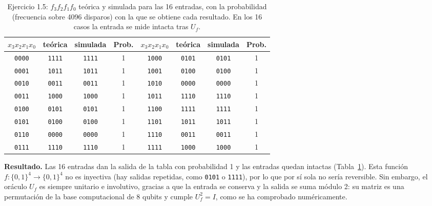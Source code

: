 \begin{table}[htbp]
    \centering
{\small\setlength{\tabcolsep}{4pt}
\begin{tabular}{c|c|c|c||c|c|c|c}
\hline
$x_3x_2x_1x_0$ & teórica & simulada & Prob. & $x_3x_2x_1x_0$ & teórica & simulada & Prob. \\
\hline
\texttt{0000} & \texttt{1111} & \texttt{1111} & 1 & \texttt{1000} & \texttt{0101} & \texttt{0101} & 1 \\
\texttt{0001} & \texttt{1011} & \texttt{1011} & 1 & \texttt{1001} & \texttt{0100} & \texttt{0100} & 1 \\
\texttt{0010} & \texttt{0011} & \texttt{0011} & 1 & \texttt{1010} & \texttt{0000} & \texttt{0000} & 1 \\
\texttt{0011} & \texttt{1000} & \texttt{1000} & 1 & \texttt{1011} & \texttt{1110} & \texttt{1110} & 1 \\
\texttt{0100} & \texttt{0101} & \texttt{0101} & 1 & \texttt{1100} & \texttt{1111} & \texttt{1111} & 1 \\
\texttt{0101} & \texttt{0100} & \texttt{0100} & 1 & \texttt{1101} & \texttt{1011} & \texttt{1011} & 1 \\
\texttt{0110} & \texttt{0000} & \texttt{0000} & 1 & \texttt{1110} & \texttt{0011} & \texttt{0011} & 1 \\
\texttt{0111} & \texttt{1110} & \texttt{1110} & 1 & \texttt{1111} & \texttt{1000} & \texttt{1000} & 1 \\
\hline
\end{tabular}}
    \caption{Ejercicio 1.5: $f_3f_2f_1f_0$ teórica y simulada para las 16 entradas, con la probabilidad (frecuencia sobre 4096 disparos) con la que se obtiene
    cada resultado. En los 16 casos la entrada se mide intacta tras $U_f$.}\label{tab:bloque1_e1_5}
\end{table}

\textbf{Resultado.} Las 16 entradas dan la salida de la tabla con probabilidad 1 y las entradas quedan intactas (Tabla~\ref{tab:bloque1_e1_5}).
Esta función $f:\{0,1\}^4\to\{0,1\}^4$ no es inyectiva (hay salidas repetidas, como \texttt{0101} o \texttt{1111}), por lo que por sí sola no sería reversible. Sin embargo, el oráculo $U_f$
es siempre unitario e involutivo, gracias a que la entrada se conserva y la salida se suma módulo 2: su matriz es una permutación de la base computacional
de 8 qubits y cumple $U_f^2=I$, como se ha comprobado numéricamente.



